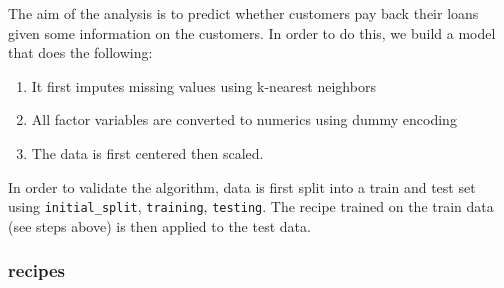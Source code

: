 \documentclass[
]{scrbook}
\providecommand{\tightlist}{%
  \setlength{\itemsep}{0pt}\setlength{\parskip}{0pt}}
\begin{document}
The aim of the analysis is to predict whether customers pay back their loans given some information on the customers.
In order to do this, we build a model that does the following:

\begin{enumerate}
\def\labelenumi{\arabic{enumi}.}
\tightlist
\item
  It first imputes missing values using k-nearest neighbors
\item
  All factor variables are converted to numerics using dummy encoding
\item
  The data is first centered then scaled.
\end{enumerate}

In order to validate the algorithm, data is first split into a train and test set using \texttt{initial\_split}, \texttt{training}, \texttt{testing}.
The recipe trained on the train data (see steps above) is then applied to the test data.

\hypertarget{recipes}{%
\subsubsection{recipes}\label{recipes}}
\end{document}
